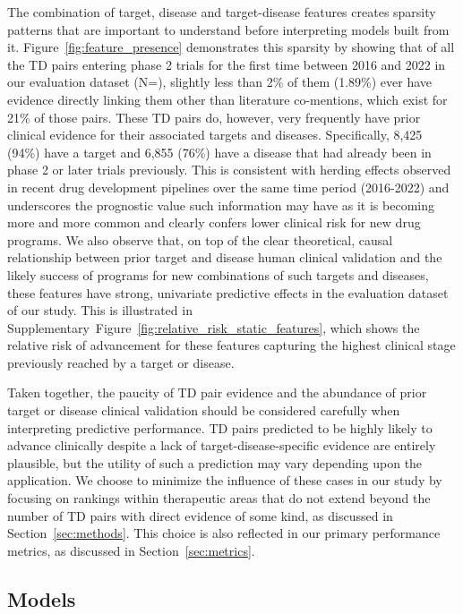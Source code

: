 \documentclass{article}
\begin{document}
The combination of target, disease and target-disease features creates sparsity patterns that are important to understand before interpreting models built from it. Figure~\ref{fig:feature_presence} demonstrates this sparsity by showing that of all the TD pairs entering phase 2 trials for the first time between 2016 and 2022 in our evaluation dataset (N=\evaluationDatasetPairCount), slightly less than 2\% of them (1.89\%) ever have evidence directly linking them other than literature co-mentions, which exist for 21\% of those pairs. These TD pairs do, however, very frequently have prior clinical evidence for their associated targets and diseases. Specifically, 8,425 (94\%) have a target and 6,855 (76\%) have a disease that had already been in phase 2 or later trials previously. This is consistent with herding effects observed in recent drug development pipelines \cite{PMID:37117303} over the same time period (2016-2022) and underscores the prognostic value such information may have as it is becoming more and more common and clearly confers lower clinical risk for new drug programs. We also observe that, on top of the clear theoretical, causal relationship between prior target and disease human clinical validation and the likely success of programs for new combinations of such targets and diseases, these features have strong, univariate predictive effects in the evaluation dataset of our study. This is illustrated in Supplementary~Figure~\ref{fig:relative_risk_static_features}, which shows the relative risk of advancement for these features capturing the highest clinical stage previously reached by a target or disease.

Taken together, the paucity of TD pair evidence and the abundance of prior target or disease clinical validation should be considered carefully when interpreting predictive performance. TD pairs predicted to be highly likely to advance clinically despite a lack of target-disease-specific evidence are entirely plausible, but the utility of such a prediction may vary depending upon the application. We choose to minimize the influence of these cases in our study by focusing on rankings within therapeutic areas that do not extend beyond the number of TD pairs with direct evidence of some kind, as discussed in Section~\ref{sec:methods}. This choice is also reflected in our primary performance metrics, as discussed in Section~\ref{sec:metrics}.

\subsection{Models}
\label{sec:models}
\end{document}
